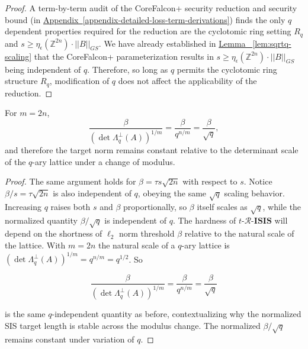 \begin{proof}

A term-by-term audit of the CoreFalcon+ security reduction and security bound 
(in \hyperref[appendix-detailed-loss-term-derivations]{Appendix~\ref*{appendix-detailed-loss-term-derivations}})
finds the only $q$ dependent properties required for the reduction are the cyclotomic ring setting $R_q$
and $s \ge \eta_\epsilon(\mathbb{Z}^{2n}) \cdot ||B||_{GS}$. We have already established in 
\hyperref[lem:sqrtq-scaling]{Lemma ~\ref*{lem:sqrtq-scaling}} that the 
CoreFalcon+ parameterization results in $s \ge \eta_\epsilon(\mathbb{Z}^{2n}) \cdot ||B||_{GS}$ being 
independent of $q$. 
Therefore, so long as $q$ permits the cyclotomic ring structure $R_q$, modification of $q$ does not 
affect the applicability of the reduction.

\end{proof}


\begin{corollary}\label{thm:sis-target-invariance}
For $m = 2n$,
\[
\frac{\beta}{(\det\Lambda_q^\perp(A))^{1/m}}
=
\frac{\beta}{q^{n/m}}
=
\frac{\beta}{\sqrt{q}},
\]
and therefore the target norm remains constant relative to the determinant scale of the $q$-ary lattice under a change of modulus.
\end{corollary}

\begin{proof}

The same argument holds for \(\beta = \tau s \sqrt{2n}\) with respect to $s$. 
Notice 
\(\beta/s = \tau\sqrt{2n}\) is also independent of \(q\), obeying the same $\sqrt{q}$ scaling behavior. 
Increasing \(q\) raises both \(s\) and \(\beta\) proportionally, so \(\beta\) itself scales as \(\sqrt{q}\),
while the normalized quantity \(\beta / \sqrt{q}\) is independent of \(q\).
The hardness of $t\text{-}\mathcal{R}\text{-}\mathbf{ISIS}$ will depend on 
the shortness of $\ell_2$ norm threshold $\beta$ relative to the natural scale of the lattice.
With \(m = 2n\) the natural scale of a \(q\)-ary lattice is \((\det \Lambda_q^\perp(A))^{1/m} = q^{n/m} = q^{1/2}\). 
So

\[
\frac{\beta}{(\det\Lambda_q^\perp(A))^{1/m}}
=
\frac{\beta}{q^{n/m}}
=
\frac{\beta}{\sqrt{q}}
\]

is the same \(q\)-independent quantity as before, contextualizing why the normalized
SIS target length is stable across the modulus change. The normalized $\beta / \sqrt{q}$ 
remains constant under variation of $q$.

\end{proof}



